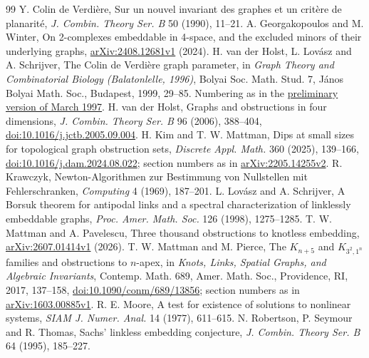\documentclass[11pt]{article}
\theoremstyle{remark}
\begin{document}
\begin{thebibliography}{99}
 Y. Colin de Verdière, Sur un nouvel invariant des graphes et
  un critère de planarité, \emph{J. Combin. Theory Ser. B} 50 (1990),
  11--21.
 A. Georgakopoulos and M. Winter, On 2-complexes embeddable in
  4-space, and the excluded minors of their underlying graphs,
  \href{https://arxiv.org/abs/2408.12681v1}{arXiv:2408.12681v1} (2024).
 H. van der Holst, L. Lovász and A. Schrijver, The Colin de
  Verdière graph parameter, in \emph{Graph Theory and Combinatorial
  Biology (Balatonlelle, 1996)}, Bolyai Soc. Math. Stud. 7, János Bolyai
  Math. Soc., Budapest, 1999, 29--85. Numbering as in the
  \href{https://homepages.cwi.nl/~lex/files/cdvsurvey_new2.pdf}{preliminary
  version of March 1997}.
 H. van der Holst, Graphs and obstructions in four
  dimensions, \emph{J. Combin. Theory Ser. B} 96 (2006), 388--404,
  \href{https://doi.org/10.1016/j.jctb.2005.09.004}{doi:10.1016/j.jctb.2005.09.004}.
 H. Kim and T. W. Mattman, Dips at small sizes for topological
  graph obstruction sets, \emph{Discrete Appl. Math.} 360 (2025), 139--166,
  \href{https://doi.org/10.1016/j.dam.2024.08.022}{doi:10.1016/j.dam.2024.08.022};
  section numbers as in
  \href{https://arxiv.org/abs/2205.14255v2}{arXiv:2205.14255v2}.
 R. Krawczyk, Newton-Algorithmen zur Bestimmung von Nullstellen
  mit Fehlerschranken, \emph{Computing} 4 (1969), 187--201.
 L. Lovász and A. Schrijver, A Borsuk theorem for antipodal
  links and a spectral characterization of linklessly embeddable graphs,
  \emph{Proc. Amer. Math. Soc.} 126 (1998), 1275--1285.
 T. W. Mattman and A. Pavelescu, Three thousand obstructions
  to knotless embedding,
  \href{https://arxiv.org/abs/2607.01414v1}{arXiv:2607.01414v1} (2026).
 T. W. Mattman and M. Pierce, The $K_{n+5}$ and
  $K_{3^2,1^n}$ families and obstructions to $n$-apex, in \emph{Knots,
  Links, Spatial Graphs, and Algebraic Invariants}, Contemp. Math. 689,
  Amer. Math. Soc., Providence, RI, 2017, 137--158,
  \href{https://doi.org/10.1090/conm/689/13856}{doi:10.1090/conm/689/13856};
  section numbers as in
  \href{https://arxiv.org/abs/1603.00885v1}{arXiv:1603.00885v1}.
 R. E. Moore, A test for existence of solutions to nonlinear
  systems, \emph{SIAM J. Numer. Anal.} 14 (1977), 611--615.
 N. Robertson, P. Seymour and R. Thomas, Sachs' linkless
  embedding conjecture, \emph{J. Combin. Theory Ser. B} 64 (1995),
  185--227.
\end{thebibliography}
\end{document}
